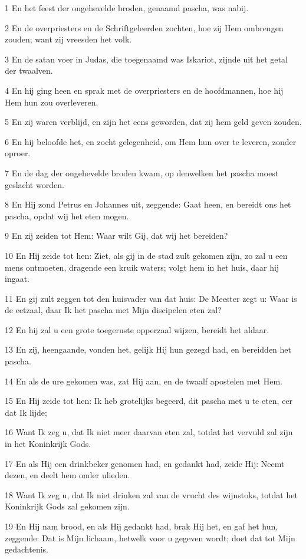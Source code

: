 \par 1 En het feest der ongehevelde broden, genaamd pascha, was nabij.
\par 2 En de overpriesters en de Schriftgeleerden zochten, hoe zij Hem ombrengen zouden; want zij vreesden het volk.
\par 3 En de satan voer in Judas, die toegenaamd was Iskariot, zijnde uit het getal der twaalven.
\par 4 En hij ging heen en sprak met de overpriesters en de hoofdmannen, hoe hij Hem hun zou overleveren.
\par 5 En zij waren verblijd, en zijn het eens geworden, dat zij hem geld geven zouden.
\par 6 En hij beloofde het, en zocht gelegenheid, om Hem hun over te leveren, zonder oproer.
\par 7 En de dag der ongehevelde broden kwam, op denwelken het pascha moest geslacht worden.
\par 8 En Hij zond Petrus en Johannes uit, zeggende: Gaat heen, en bereidt ons het pascha, opdat wij het eten mogen.
\par 9 En zij zeiden tot Hem: Waar wilt Gij, dat wij het bereiden?
\par 10 En Hij zeide tot hen: Ziet, als gij in de stad zult gekomen zijn, zo zal u een mens ontmoeten, dragende een kruik waters; volgt hem in het huis, daar hij ingaat.
\par 11 En gij zult zeggen tot den huisvader van dat huis: De Meester zegt u: Waar is de eetzaal, daar Ik het pascha met Mijn discipelen eten zal?
\par 12 En hij zal u een grote toegeruste opperzaal wijzen, bereidt het aldaar.
\par 13 En zij, heengaande, vonden het, gelijk Hij hun gezegd had, en bereidden het pascha.
\par 14 En als de ure gekomen was, zat Hij aan, en de twaalf apostelen met Hem.
\par 15 En Hij zeide tot hen: Ik heb grotelijks begeerd, dit pascha met u te eten, eer dat Ik lijde;
\par 16 Want Ik zeg u, dat Ik niet meer daarvan eten zal, totdat het vervuld zal zijn in het Koninkrijk Gods.
\par 17 En als Hij een drinkbeker genomen had, en gedankt had, zeide Hij: Neemt dezen, en deelt hem onder ulieden.
\par 18 Want Ik zeg u, dat Ik niet drinken zal van de vrucht des wijnstoks, totdat het Koninkrijk Gods zal gekomen zijn.
\par 19 En Hij nam brood, en als Hij gedankt had, brak Hij het, en gaf het hun, zeggende: Dat is Mijn lichaam, hetwelk voor u gegeven wordt; doet dat tot Mijn gedachtenis.
